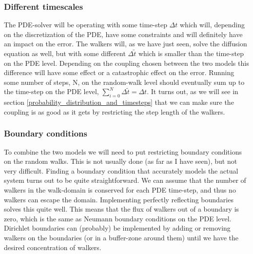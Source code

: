 \subsubsection{Different timescales}
  The PDE-solver will be operating with some time-step $\Delta t$ which will, depending on the discretization of the PDE, have some constraints and will definitely have an impact on the error. 
  The walkers will, as we have just seen, solve the diffusion equation as well, but with some different $\Delta \tilde{t}$ which is smaller than the time-step on the PDE level. 
  Depending on the coupling chosen between the two models this difference will have some effect or a catastrophic effect on the error. 
  Running some number of steps, N, on the random-walk level should eventually sum up to the time-step on the PDE level, $\sum\limits_{i=0}^N \Delta\tilde{t} = \Delta t$. 
  It turns out, as we will see in section \ref{probability_distribution_and_timesteps} that we can make sure the coupling is as good as it gets by restricting the step length of the walkers.

\subsubsection{Boundary conditions}
 To combine the two models we will need to put restricting boundary conditions on the random walks. This is not usually done (as far as I have seen), but not very difficult. 
 Finding a boundary condition that accurately models the actual system turns out to be quite straightforward.
 We can assume that the number of walkers in the walk-domain is conserved for each PDE time-step, and thus no walkers can escape the domain. 
 Implementing perfectly reflecting boundaries solves this quite well. 
 This means that the flux of walkers out of a boundary is zero, which is the same as Neumann boundary conditions on the PDE level. \\
 Dirichlet boundaries can (probably) be implemented by adding or removing walkers on the boundaries (or in a buffer-zone around them) until we have the desired concentration of walkers.
 
